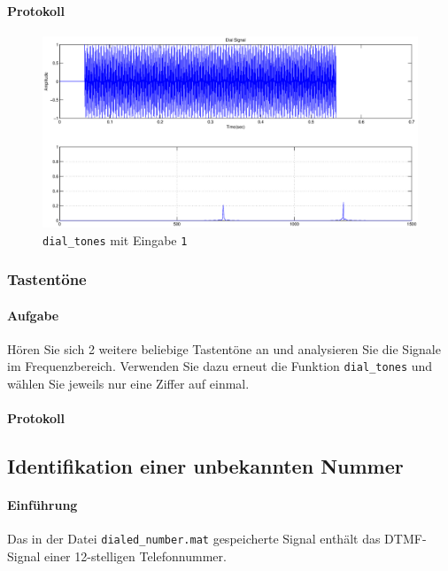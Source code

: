 \documentclass[10pt]{report}
\begin{document}
        \paragraph{Protokoll}
        \begin{center}
            \begin{figure}[H]
                \includegraphics[width=\textwidth]{img4341}
              \caption{\texttt{dial\_tones} mit Eingabe \texttt{1}}
            \end{figure}
        \end{center}

        \subsubsection{Tastentöne}
        \paragraph{Aufgabe}
        Hören Sie sich 2 weitere beliebige Tastentöne an und analysieren Sie die Signale im
        Frequenzbereich. Verwenden Sie dazu erneut die Funktion \texttt{dial\_tones} und wählen
        Sie jeweils nur eine Ziffer auf einmal.
        \paragraph{Protokoll}

        \subsection{Identifikation einer unbekannten Nummer}
        \paragraph{Einführung}
        Das in der Datei \texttt{dialed\_number.mat} gespeicherte Signal enthält das DTMF-Signal einer
        12-stelligen Telefonnummer.
\end{document}
